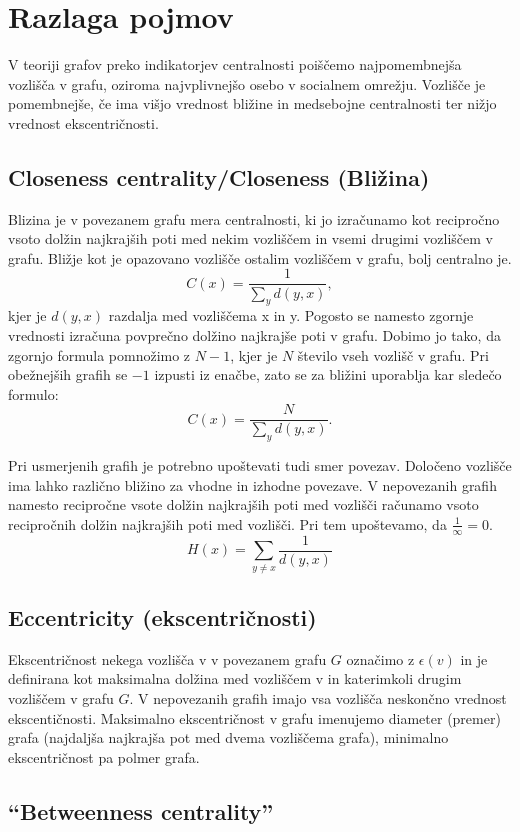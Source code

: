 \documentclass[12pt,a4paper]{amsart}
\begin{document}
\section{Razlaga pojmov}

V teoriji grafov preko indikatorjev centralnosti poiščemo najpomembnejša vozlišča v grafu, oziroma najvplivnejšo osebo v socialnem omrežju. Vozlišče je pomembnejše, če ima višjo vrednost bližine in medsebojne centralnosti ter nižjo vrednost ekscentričnosti.

\subsection{Closeness centrality/Closeness (Bližina)}

Blizina je v povezanem grafu mera centralnosti, ki jo izračunamo kot recipročno vsoto dolžin najkrajših poti med nekim vozliščem in vsemi drugimi vozliščem v grafu. Bližje kot je opazovano vozlišče ostalim vozliščem v grafu, bolj centralno je.
$$C(x) = \frac{1}{\sum_{y}^{} d(y,x)}, $$
kjer je $d(y, x)$ razdalja med vozliščema x in y. 
Pogosto se namesto zgornje vrednosti izračuna povprečno dolžino najkrajše poti v grafu. Dobimo jo tako, da zgornjo formula pomnožimo z $N-1$, kjer je $N$ število vseh vozlišč v grafu. Pri obežnejših grafih se $-1$ izpusti iz enačbe, zato se za bližini uporablja kar sledečo formulo:
$$C(x) = \frac{N}{\sum_{y}^{} d(y,x)}.$$

Pri usmerjenih grafih je potrebno upoštevati tudi smer povezav. Določeno vozlišče ima lahko različno bližino za vhodne in izhodne povezave.
V nepovezanih grafih namesto recipročne vsote dolžin najkrajših poti med vozlišči računamo vsoto recipročnih dolžin najkrajših poti med vozlišči. Pri tem upoštevamo, da $\frac{1}{\infty} = 0.$
$$H(x) = \sum_{y \ne x}^{} \frac{1}{d(y, x)}$$


\subsection{Eccentricity (ekscentričnosti)}
Ekscentričnost nekega vozlišča v  v povezanem grafu $G$ označimo z $\epsilon(v)$ in je definirana kot maksimalna dolžina med vozliščem v in katerimkoli drugim vozliščem v grafu $G$. V nepovezanih grafih imajo vsa vozlišča neskončno vrednost ekscentičnosti.
Maksimalno ekscentričnost v grafu imenujemo diameter (premer) grafa (najdaljša najkrajša pot med dvema vozliščema grafa), minimalno ekscentričnost pa polmer grafa.


\subsection{“Betweenness centrality”}
\end{document}
